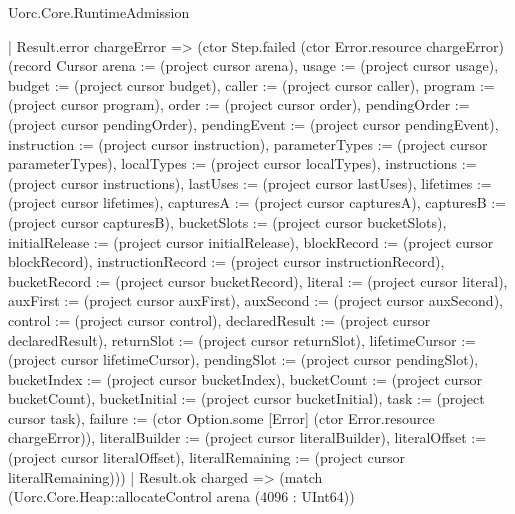\begin{lexlean}{Uorc.Core.RuntimeAdmission}
\begin{semanticmodule}
{      | Result.error chargeError => (ctor Step.failed (ctor Error.resource chargeError) (record Cursor {arena := (project cursor arena), usage := (project cursor usage), budget := (project cursor budget), caller := (project cursor caller), program := (project cursor program), order := (project cursor order), pendingOrder := (project cursor pendingOrder), pendingEvent := (project cursor pendingEvent), instruction := (project cursor instruction), parameterTypes := (project cursor parameterTypes), localTypes := (project cursor localTypes), instructions := (project cursor instructions), lastUses := (project cursor lastUses), lifetimes := (project cursor lifetimes), capturesA := (project cursor capturesA), capturesB := (project cursor capturesB), bucketSlots := (project cursor bucketSlots), initialRelease := (project cursor initialRelease), blockRecord := (project cursor blockRecord), instructionRecord := (project cursor instructionRecord), bucketRecord := (project cursor bucketRecord), literal := (project cursor literal), auxFirst := (project cursor auxFirst), auxSecond := (project cursor auxSecond), control := (project cursor control), declaredResult := (project cursor declaredResult), returnSlot := (project cursor returnSlot), lifetimeCursor := (project cursor lifetimeCursor), pendingSlot := (project cursor pendingSlot), bucketIndex := (project cursor bucketIndex), bucketCount := (project cursor bucketCount), bucketInitial := (project cursor bucketInitial), task := (project cursor task), failure := (ctor Option.some [Error] (ctor Error.resource chargeError)), literalBuilder := (project cursor literalBuilder), literalOffset := (project cursor literalOffset), literalRemaining := (project cursor literalRemaining)}))
      | Result.ok charged => (match (Uorc.Core.Heap::allocateControl arena (4096 : UInt64))
}
\end{semanticmodule}
\end{lexlean}
